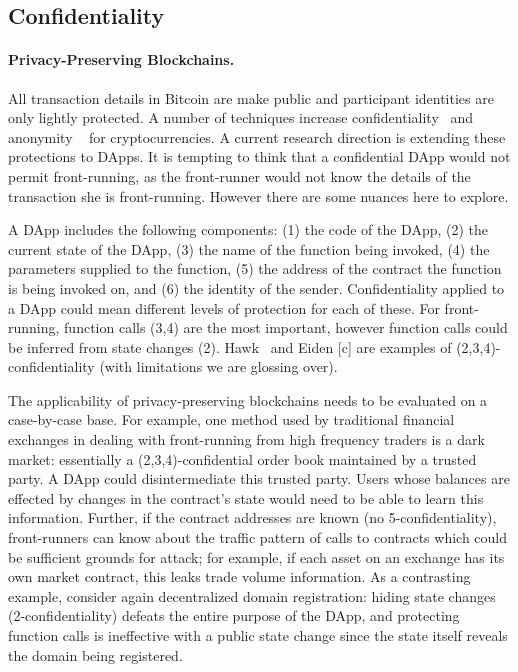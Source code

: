 \subsection{Confidentiality}

\paragraph{Privacy-Preserving Blockchains.}

All transaction details in Bitcoin are make public and participant identities are only lightly protected. A number of techniques increase confidentiality~\cite{bunzBulletproofs,maxwell2015confidential} and anonymity ~\cite{miers2013zerocoin,monerosite} for cryptocurrencies. A current research direction is extending these protections to DApps. It is tempting to think that a confidential DApp would not permit front-running, as the front-runner would not know the details of the transaction she is front-running. However there are some nuances here to explore.

A DApp includes the following components: (1) the code of the DApp, (2) the current state of the DApp, (3) the name of the function being invoked, (4) the parameters supplied to the function, (5) the address of the contract the function is being invoked on, and (6) the identity of the sender. Confidentiality applied to a DApp could mean different levels of protection for each of these. For front-running, function calls (3,4) are the most important, however function calls could be inferred from state changes (2). Hawk~\cite{kosba2016hawk} and Eiden [c] are examples of (2,3,4)-confidentiality (with limitations we are glossing over).

The applicability of privacy-preserving blockchains needs to be evaluated on a case-by-case base. For example, one method used by traditional financial exchanges in dealing with front-running from high frequency traders is a dark market: essentially a (2,3,4)-confidential order book maintained by a trusted party. A DApp could disintermediate this trusted party. Users whose balances are effected by changes in the contract's state would need to be able to learn this information. Further, if the contract addresses are known (no 5-confidentiality), front-runners can know about the traffic pattern of calls to contracts which could be sufficient grounds for attack; for example, if each asset on an exchange has its own market contract, this leaks trade volume information. As a contrasting example, consider again decentralized domain registration: hiding state changes (2-confidentiality) defeats the entire purpose of the DApp, and protecting function calls is ineffective with a public state change since the state itself reveals the domain being registered.


